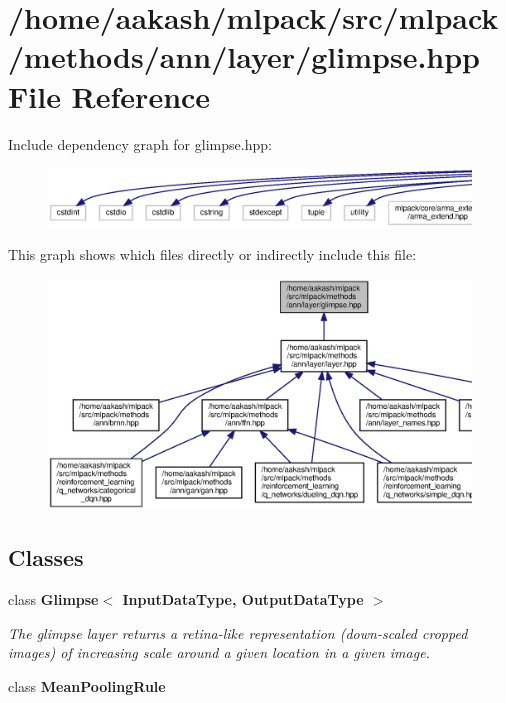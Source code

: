 \section{/home/aakash/mlpack/src/mlpack/methods/ann/layer/glimpse.hpp File Reference}
\label{glimpse_8hpp}
Include dependency graph for glimpse.\+hpp\+:
\nopagebreak
\begin{figure}[H]
\begin{center}
\leavevmode
\includegraphics[width=350pt]{glimpse_8hpp__incl}
\end{center}
\end{figure}
This graph shows which files directly or indirectly include this file\+:
\nopagebreak
\begin{figure}[H]
\begin{center}
\leavevmode
\includegraphics[width=350pt]{glimpse_8hpp__dep__incl}
\end{center}
\end{figure}
\subsection*{Classes}
\begin{DoxyCompactItemize}
\item 
class \textbf{ Glimpse$<$ Input\+Data\+Type, Output\+Data\+Type $>$}
\begin{DoxyCompactList}\small\item\em The glimpse layer returns a retina-\/like representation (down-\/scaled cropped images) of increasing scale around a given location in a given image. \end{DoxyCompactList}\item 
class \textbf{ Mean\+Pooling\+Rule}
\end{DoxyCompactItemize}
